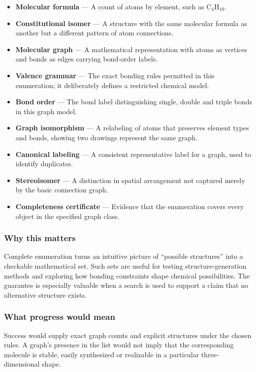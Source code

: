 \documentclass[
  11pt,
]{article}
\begin{document}
\begin{itemize}
\item
  \textbf{Molecular formula} --- A count of atoms by element, such as
  C\ensuremath{{}_{4}}H\ensuremath{{}_{10}}.
\item
  \textbf{Constitutional isomer} --- A structure with the same molecular
  formula as another but a different pattern of atom connections.
\item
  \textbf{Molecular graph} --- A mathematical representation with atoms
  as vertices and bonds as edges carrying bond-order labels.
\item
  \textbf{Valence grammar} --- The exact bonding rules permitted in this
  enumeration; it deliberately defines a restricted chemical model.
\item
  \textbf{Bond order} --- The bond label distinguishing single, double
  and triple bonds in this graph model.
\item
  \textbf{Graph isomorphism} --- A relabeling of atoms that preserves
  element types and bonds, showing two drawings represent the same
  graph.
\item
  \textbf{Canonical labeling} --- A consistent representative label for
  a graph, used to identify duplicates.
\item
  \textbf{Stereoisomer} --- A distinction in spatial arrangement not
  captured merely by the basic connection graph.
\item
  \textbf{Completeness certificate} --- Evidence that the enumeration
  covers every object in the specified graph class.
\end{itemize}

\subsubsection{Why this matters}

Complete enumeration turns an intuitive picture of ``possible
structures'' into a checkable mathematical set. Such sets are useful for
testing structure-generation methods and exploring how bonding
constraints shape chemical possibilities. The guarantee is especially
valuable when a search is used to support a claim that no alternative
structure exists.

\subsubsection{What progress would mean}

Success would supply exact graph counts and explicit structures under
the chosen rules. A graph's presence in the list would not imply that
the corresponding molecule is stable, easily synthesized or realizable
in a particular three-dimensional shape.
\end{document}
